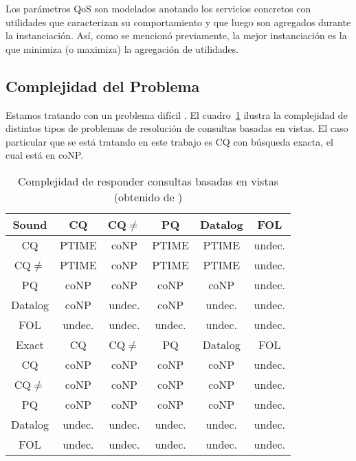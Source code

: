 Los parámetros QoS son modelados anotando los servicios concretos con utilidades
que caracterizan su comportamiento y que luego son agregados durante la
instanciación. Así, como se mencionó previamente, la mejor instanciación es la
que minimiza (o maximiza) la agregación de utilidades.

\subsection{Complejidad del Problema}

Estamos tratando con un problema difícil \cite{lenzerini:dataintegration}. 
El cuadro~\ref{cqcomplexity} ilustra la complejidad de distintos tipos de
problemas de resolución de consultas basadas en vistas. El caso particular que
se está tratando en este trabajo es CQ con búsqueda exacta, el cual está en
coNP.

\begin{table}
\begin{center}
  \begin{tabular}{|c||c|c|c|c|c|}
\hline
Sound  &  CQ  & CQ$\neq$  & PQ  &Datalog &FOL \\
\hline
  CQ  & PTIME &coNP  &PTIME &PTIME  &undec. \\
 CQ$\neq$  & PTIME &coNP  &PTIME &PTIME  &undec. \\
  PQ  &  coNP &coNP  & coNP & coNP  &undec. \\
Datalog &coNP &undec.& coNP &undec. &undec. \\
 FOL  & undec.&undec.&undec.&undec. &undec. \\
\hline
 Exact  & CQ &  CQ$\neq$     &  PQ  &Datalog &FOL \\
\hline
  CQ    &coNP &coNP  & coNP & coNP  &undec. \\
 CQ$\neq$    &coNP &coNP  & coNP & coNP  &undec. \\
  PQ    &coNP &coNP  & coNP & coNP  &undec. \\
Datalog&undec.&undec.&undec.&undec. &undec. \\
 FOL   &undec.&undec.&undec.&undec. &undec. \\
\hline
  \end{tabular}
  \caption{Complejidad de responder consultas basadas en vistas (obtenido de
\cite{lenzerini:dataintegration})}
  \label{cqcomplexity}
\end{center}
\end{table}
